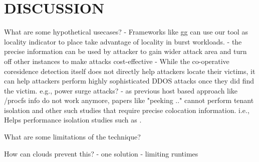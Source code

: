 \section{DISCUSSION}
\label{sec:discussion}
\todo{}
What are some hypothetical usecases?
- Frameworks like gg can use our tool as locality indicator to place 
take advantage of locality in burst workloads. 
- the precise information can be used by attacker to gain wider 
attack area and turn off other instances to make attacks cost-effective
- While the co-operative coresidence detection itself 
does not directly help attackers locate their victims, it can 
help attackers perform highly sophisticated DDOS attacks once 
they did find the victim. e.g., power surge attacks?
- as previous host based approach like /procfs info do not work anymore,
papers like "peeking .." cannot perform tenant isolation and other such 
studies that require precise colocation information. i.e., Helps performance isolation 
studies such as \cite{wangusenix2018}.

What are some limitations of the technique?


How can clouds prevent this?
- one solution \cite{MemoryBusMitigation}
- limiting runtimes